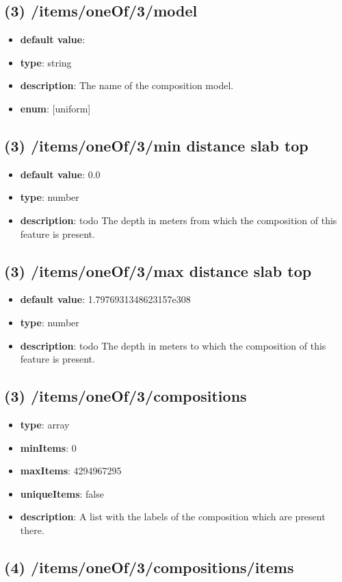 \subsection{(3) /items/oneOf/3/model}
\begin{itemize}[leftmargin=3em]\item {\bf default value}: 
\item {\bf type}: string
\item {\bf description}: The name of the composition model.
\item {\bf enum}: [uniform]\end{itemize}\subsection{(3) /items/oneOf/3/min distance slab top}
\begin{itemize}[leftmargin=3em]\item {\bf default value}: 0.0
\item {\bf type}: number
\item {\bf description}: todo The depth in meters from which the composition of this feature is present.
\end{itemize}\subsection{(3) /items/oneOf/3/max distance slab top}
\begin{itemize}[leftmargin=3em]\item {\bf default value}: 1.7976931348623157e308
\item {\bf type}: number
\item {\bf description}: todo The depth in meters to which the composition of this feature is present.
\end{itemize}\subsection{(3) /items/oneOf/3/compositions}
\begin{itemize}[leftmargin=3em]\item {\bf type}: array
\item {\bf minItems}: 0
\item {\bf maxItems}: 4294967295
\item {\bf uniqueItems}: false
\item {\bf description}: A list with the labels of the composition which are present there.
\end{itemize}\subsection{(4) /items/oneOf/3/compositions/items}
